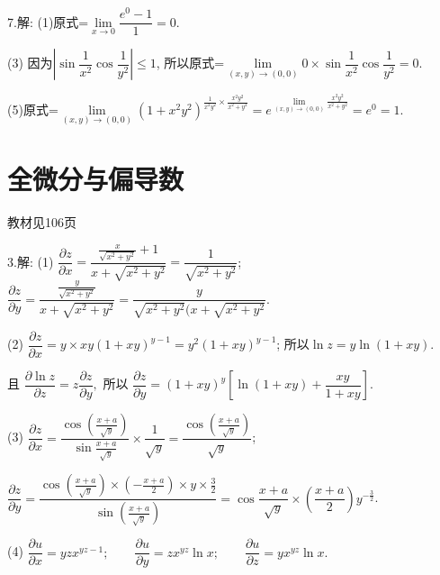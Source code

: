   7.解: (1)原式=$ \mathop {\lim }\limits_{x \to 0} \dfrac{{{e^0} - 1}}{1} = 0$.

  (3) 因为$ |\sin \dfrac{1}{{{x^2}}}\cos \dfrac{1}{{{y^2}}}| \le 1$,
  所以原式=$ \mathop {\lim }\limits_{(x,y) \to (0,0)} 0 \times \sin \dfrac{1}{{{x^2}}}\cos \dfrac{1}{{{y^2}}} = 0$.

  (5)原式=$ \mathop {\lim }\limits_{(x,y) \to (0,0)} {(1 + {x^2}{y^2})^{\frac{1}{{{x^2}{y^2}}} \times \frac{{{x^2}{y^2}}}{{{x^2} + {y^2}}}}} = {e^{\mathop {\lim }\limits_{(x,y) \to (0,0)} \frac{{{x^2}{y^2}}}{{{x^2} + {y^2}}}}} = {e^0} = 1$.

\section{全微分与偏导数}
\begin{flushright}
  \color{zhanqing!80}
   教材见106页
\end{flushright}

  3.解: (1) $ \dfrac{{\partial z}}{{\partial x}} = \dfrac{{\frac{x}{{\sqrt {{x^2} + {y^2}} }} + 1}}{{x + \sqrt {{x^2} + {y^2}} }} = \dfrac{1}{{\sqrt {{x^2} + {y^2}} }}$; \qquad
  $ \dfrac{{\partial z}}{{\partial y}} = \dfrac{{\frac{y}{{\sqrt {{x^2} + {y^2}} }}}}{{x + \sqrt {{x^2} + {y^2}} }} = \dfrac{y}{{\sqrt {{x^2} + {y^2}} (x + \sqrt {{x^2} + {y^2}} }}. $

  (2) $ \dfrac{{\partial z}}{{\partial x}} = y \times xy{(1 + xy)^{y - 1}} = {y^2}{(1 + xy)^{y - 1}}$; 所以$\ln z = y\ln \left( {1 + xy} \right).$

  且 $ \dfrac{{\partial \ln z}}{{\partial z}} = z\dfrac{{\partial z}}{{\partial y}}, $
  所以 $ \dfrac{{\partial z}}{{\partial y}} = {(1 + xy)^y}\left[\ln (1 + xy) + \dfrac{{xy}}{{1 + xy}}\right]. $

  (3) $ \dfrac{{\partial z}}{{\partial x}}
  = \dfrac{{\cos \left(\frac{{x + a}}{{\sqrt y }}\right)}}{{\sin \frac{{x + a}}{{\sqrt y }}}} \times \dfrac{1}{{\sqrt y }}
  = \dfrac{{\cos \left(\frac{{x + a}}{{\sqrt y }}\right)}}{{\sqrt y }}$;

  $ \dfrac{{\partial z}}{{\partial y}}
  = \dfrac{{\cos \left(\frac{{x + a}}{{\sqrt y }}\right) \times \left( - \frac{{x + a}}{2} \right) \times y \times \frac{3}{2}}}{{\sin \left(\frac{{x + a}}{{\sqrt y }} \right)}}
  = \cos \dfrac{{x + a}}{{\sqrt y }} \times (\dfrac{{x + a}}{2}){y^{ - \frac{3}{2}}}$.

  (4) $ \dfrac{{\partial u}}{{\partial x}} = yz{x^{yz - 1}}; \qquad
  \dfrac{{\partial u}}{{\partial y}} = z{x^{yz}}\ln x; \qquad \dfrac{{\partial u}}{{\partial z}} = y{x^{yz}}\ln x. $

